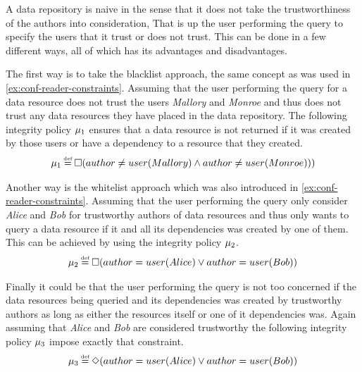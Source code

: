 \begin{example}
A data repository is naive in the sense that it does not take the trustworthiness of the authors into consideration, That is up the user performing the query to specify the users that it trust or does not trust. This can be done in a few different ways, all of which has its advantages and disadvantages.

The first way is to take the blacklist approach, the same concept as was used in \autoref{ex:conf-reader-constraints}. Assuming that the user performing the query for a data resource does not trust the users \emph{Mallory} and \emph{Monroe} and thus does not trust any data resources they have placed in the data repository. The following integrity policy $\mu_1$ ensures that a data resource is not returned if it was created by those users or have a dependency to a resource that they created.
\begin{align*}
    \inte_1 \eqdef \G( author \neq user(Mallory) \land author \neq user(Monroe)))
\end{align*}

Another way is the whitelist approach which was also introduced in \autoref{ex:conf-reader-constraints}. Assuming that the user performing the query only consider \emph{Alice} and \emph{Bob} for trustworthy authors of data resources and thus only wants to query a data resource if it and all its dependencies was created by one of them. This can be achieved by using the integrity policy $\mu_2$.
\begin{align*}
    \inte_2 \eqdef \G(author = user(Alice) \lor author = user(Bob))
\end{align*}

Finally it could be that the user performing the query is not too concerned if the data resources being queried and its dependencies was created by trustworthy authors as long as either the resources itself or one of it dependencies was. Again assuming that \emph{Alice} and \emph{Bob} are considered trustworthy the following integrity policy $\mu_3$ impose exactly that constraint.
\begin{align*}
    \inte_3 \eqdef \F(author = user(Alice) \lor author = user(Bob))
\end{align*}
\end{example}
